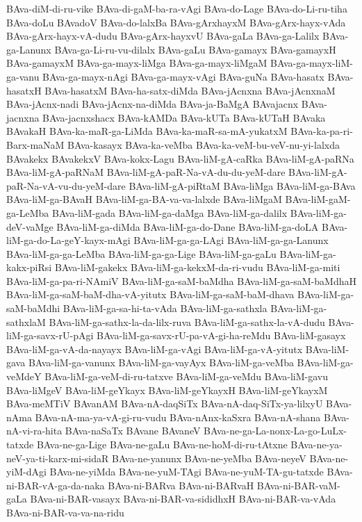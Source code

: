 {BAva-diM-di-ru-vike
BAva-di-gaM-ba-ra-vAgi
BAva-do-Lage
BAva-do-Li-ru-tiha
BAva-doLu
BAvadoV
BAva-do-lalxBa
BAva-gArxhayxM
BAva-gArx-hayx-vAda
BAva-gArx-hayx-vA-dudu
BAva-gArx-hayxvU
BAva-gaLa
BAva-ga-Lalilx
BAva-ga-Lanunx
BAva-ga-Li-ru-vu-dilalx
BAva-gaLu
BAva-gamayx
BAva-gamayxH
BAva-gamayxM
BAva-ga-mayx-liMga
BAva-ga-mayx-liMgaM
BAva-ga-mayx-liM-ga-vanu
BAva-ga-mayx-nAgi
BAva-ga-mayx-vAgi
BAva-guNa
BAva-hasatx
BAva-hasatxH
BAva-hasatxM
BAva-ha-satx-diMda
BAva-jAcnxna
BAva-jAcnxnaM
BAva-jAcnx-nadi
BAva-jAcnx-na-diMda
BAva-ja-BaMgA
BAvajacnx
BAva-jacnxna
BAva-jacnxshacx
BAva-kAMDa
BAva-kUTa
BAva-kUTaH
BAvaka
BAvakaH
BAva-ka-maR-ga-LiMda
BAva-ka-maR-sa-mA-yukatxM
BAva-ka-pa-ri-Barx-maNaM
BAva-kasayx
BAva-ka-veMba
BAva-ka-veM-bu-veV-nu-yi-lalxda
BAvakekx
BAvakekxV
BAva-kokx-Lagu
BAva-liM-gA-caRka
BAva-liM-gA-paRNa
BAva-liM-gA-paRNaM
BAva-liM-gA-paR-Na-vA-du-du-yeM-dare
BAva-liM-gA-paR-Na-vA-vu-du-yeM-dare
BAva-liM-gA-piRtaM
BAva-liMga
BAva-liM-ga-BAva
BAva-liM-ga-BAvaH
BAva-liM-ga-BA-va-va-lalxde
BAva-liMgaM
BAva-liM-gaM-ga-LeMba
BAva-liM-gada
BAva-liM-ga-daMga
BAva-liM-ga-dalilx
BAva-liM-ga-deV-vaMge
BAva-liM-ga-diMda
BAva-liM-ga-do-Dane
BAva-liM-ga-doLA
BAva-liM-ga-do-La-geY-kayx-mAgi
BAva-liM-ga-ga-LAgi
BAva-liM-ga-ga-Lanunx
BAva-liM-ga-ga-LeMba
BAva-liM-ga-ga-Lige
BAva-liM-ga-gaLu
BAva-liM-ga-kakx-piRsi
BAva-liM-gakekx
BAva-liM-ga-kekxM-da-ri-vudu
BAva-liM-ga-miti
BAva-liM-ga-pa-ri-NAmiV
BAva-liM-ga-saM-baMdha
BAva-liM-ga-saM-baMdhaH
BAva-liM-ga-saM-baM-dha-vA-yitutx
BAva-liM-ga-saM-baM-dhava
BAva-liM-ga-saM-baMdhi
BAva-liM-ga-sa-hi-ta-vAda
BAva-liM-ga-sathxla
BAva-liM-ga-sathxlaM
BAva-liM-ga-sathx-la-da-lilx-ruva
BAva-liM-ga-sathx-la-vA-dudu
BAva-liM-ga-savx-rU-pAgi
BAva-liM-ga-savx-rU-pa-vA-gi-ha-reMdu
BAva-liM-gasayx
BAva-liM-ga-vA-da-nayayx
BAva-liM-ga-vAgi
BAva-liM-ga-vA-yitutx
BAva-liM-gava
BAva-liM-ga-vanunx
BAva-liM-ga-vayAyx
BAva-liM-ga-veMba
BAva-liM-ga-veMdeY
BAva-liM-ga-veM-di-ru-tatxve
BAva-liM-ga-veMdu
BAva-liM-gavu
BAva-liMgeV
BAva-liM-geYkayx
BAva-liM-geYkayxH
BAva-liM-geYkayxM
BAva-meMTiV
BAvanAM
BAva-nA-daqSiTx
BAva-nA-daq-SiTx-ya-lilxyU
BAva-nAma
BAva-nA-ma-ya-vA-gi-ru-vudu
BAva-nAnx-kaSxra
BAva-nA-shana
BAva-nA-vi-ra-hita
BAva-naSaTx
BAvane
BAvaneV
BAva-ne-ga-La-nonx-La-go-LuLx-tatxde
BAva-ne-ga-Lige
BAva-ne-gaLu
BAva-ne-hoM-di-ru-tAtxne
BAva-ne-ya-neV-ya-ti-karx-mi-sidaR
BAva-ne-yanunx
BAva-ne-yeMba
BAva-neyeV
BAva-ne-yiM-dAgi
BAva-ne-yiMda
BAva-ne-yuM-TAgi
BAva-ne-yuM-TA-gu-tatxde
BAva-ni-BAR-vA-ga-da-naka
BAva-ni-BARva
BAva-ni-BARvaH
BAva-ni-BAR-vaM-gaLa
BAva-ni-BAR-vasayx
BAva-ni-BAR-va-sididhxH
BAva-ni-BAR-va-vAda
BAva-ni-BAR-va-va-na-ridu
}
